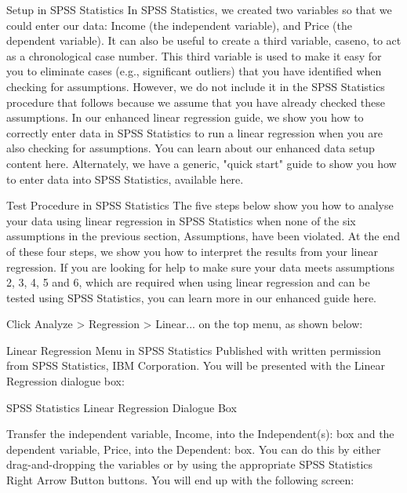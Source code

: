 \documentclass[]{article}
\begin{document}
	
	Setup in SPSS Statistics
	In SPSS Statistics, we created two variables so that we could enter our data: Income (the independent variable), and Price (the dependent variable). It can also be useful to create a third variable, caseno, to act as a chronological case number. This third variable is used to make it easy for you to eliminate cases (e.g., significant outliers) that you have identified when checking for assumptions. However, we do not include it in the SPSS Statistics procedure that follows because we assume that you have already checked these assumptions. In our enhanced linear regression guide, we show you how to correctly enter data in SPSS Statistics to run a linear regression when you are also checking for assumptions. You can learn about our enhanced data setup content here. Alternately, we have a generic, "quick start" guide to show you how to enter data into SPSS Statistics, available here.
	
	
	Test Procedure in SPSS Statistics
	The five steps below show you how to analyse your data using linear regression in SPSS Statistics when none of the six assumptions in the previous section, Assumptions, have been violated. At the end of these four steps, we show you how to interpret the results from your linear regression. If you are looking for help to make sure your data meets assumptions 2, 3, 4, 5 and 6, which are required when using linear regression and can be tested using SPSS Statistics, you can learn more in our enhanced guide here.
	
	Click Analyze > Regression > Linear... on the top menu, as shown below:
	
	Linear Regression Menu in SPSS Statistics
	Published with written permission from SPSS Statistics, IBM Corporation.
	You will be presented with the Linear Regression dialogue box:
	
	SPSS Statistics Linear Regression Dialogue Box
	
	Transfer the independent variable, Income, into the Independent(s): box and the dependent variable, Price, into the Dependent: box. You can do this by either drag-and-dropping the variables or by using the appropriate SPSS Statistics Right Arrow Button buttons. You will end up with the following screen:
	
\end{document}
